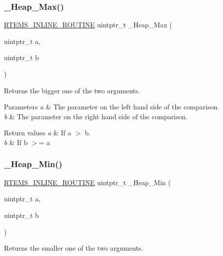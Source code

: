 \subsubsection{\texorpdfstring{\_Heap\_Max()}{\_Heap\_Max()}}
{\footnotesize\ttfamily \mbox{\hyperlink{group__RTEMSScoreBaseDefs_gac216239df231d5dbd15e3520b0b9313f}{R\+T\+E\+M\+S\+\_\+\+I\+N\+L\+I\+N\+E\+\_\+\+R\+O\+U\+T\+I\+NE}} uintptr\+\_\+t \+\_\+\+Heap\+\_\+\+Max (\begin{DoxyParamCaption}\item[{uintptr\+\_\+t}]{a,  }\item[{uintptr\+\_\+t}]{b }\end{DoxyParamCaption})}



Returns the bigger one of the two arguments. 


\begin{DoxyParams}{Parameters}
{\em a} & The parameter on the left hand side of the comparison. \\
\hline
{\em b} & The parameter on the right hand side of the comparison.\\
\hline
\end{DoxyParams}

\begin{DoxyRetVals}{Return values}
{\em a} & If a $>$ b. \\
\hline
{\em b} & If b $>$= a \\
\hline
\end{DoxyRetVals}
\mbox{\label{group__RTEMSScoreHeap_ga09fb0b895f87524b8bf4e7fe7c1b41da}} 
\subsubsection{\texorpdfstring{\_Heap\_Min()}{\_Heap\_Min()}}
{\footnotesize\ttfamily \mbox{\hyperlink{group__RTEMSScoreBaseDefs_gac216239df231d5dbd15e3520b0b9313f}{R\+T\+E\+M\+S\+\_\+\+I\+N\+L\+I\+N\+E\+\_\+\+R\+O\+U\+T\+I\+NE}} uintptr\+\_\+t \+\_\+\+Heap\+\_\+\+Min (\begin{DoxyParamCaption}\item[{uintptr\+\_\+t}]{a,  }\item[{uintptr\+\_\+t}]{b }\end{DoxyParamCaption})}



Returns the smaller one of the two arguments. 


